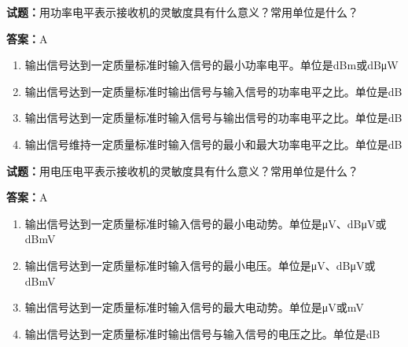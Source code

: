 \documentclass{ctexbook}
\begin{document}




\vspace{1em}

\textbf{试题：}用功率电平表示接收机的灵敏度具有什么意义？常用单位是什么？ 

\textbf{答案：}A 


\begin{enumerate}[leftmargin=3em]
  \item 输出信号达到一定质量标准时输入信号的最小功率电平。单位是dBm或dBμW 

  \item 输出信号达到一定质量标准时输出信号与输入信号的功率电平之比。单位是dB 

  \item 输出信号达到一定质量标准时输入信号与输出信号的功率电平之比。单位是dB 

  \item 输出信号维持一定质量标准时输入信号的最小和最大功率电平之比。单位是dB 

\end{enumerate}





\vspace{1em}

\textbf{试题：}用电压电平表示接收机的灵敏度具有什么意义？常用单位是什么？ 

\textbf{答案：}A 

\begin{enumerate}[leftmargin=3em]
  \item 输出信号达到一定质量标准时输入信号的最小电动势。单位是μV、dBμV或dBmV 

  \item 输出信号达到一定质量标准时输入信号的最小电压。单位是μV、dBμV或dBmV 

  \item 输出信号达到一定质量标准时输入信号的最大电动势。单位是μV或mV 

  \item 输出信号达到一定质量标准时输出信号与输入信号的电压之比。单位是dB 

\end{enumerate}



\end{document}
